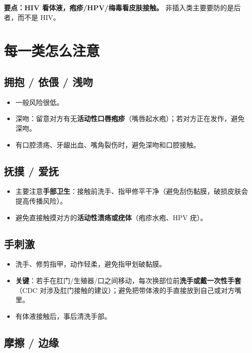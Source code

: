 \documentclass[12pt,UTF8,openany]{ctexbook}
\begin{document}
\textbf{要点：HIV 看体液，疱疹/HPV/梅毒看皮肤接触。}
非插入类主要要防的是后者，而不是 HIV。

\section{每一类怎么注意}

\subsection*{拥抱 / 依偎 / 浅吻}

\begin{itemize}[leftmargin=2em]
  \item 一般风险很低。
  \item 深吻：留意对方有无\textbf{活动性口唇疱疹}（嘴唇起水疱）；若对方正在发作，避免深吻。
  \item 有口腔溃疡、牙龈出血、嘴角裂伤时，避免深吻和口腔接触。
\end{itemize}

\subsection*{抚摸 / 爱抚}

\begin{itemize}[leftmargin=2em]
  \item 主要注意\textbf{手部卫生}：接触前洗手、指甲修平干净（避免刮伤黏膜，破损皮肤会提高传播风险）。
  \item 避免直接触摸对方的\textbf{活动性溃疡或疣体}（疱疹水疱、HPV 疣）。
\end{itemize}

\subsection*{手刺激}

\begin{itemize}[leftmargin=2em]
  \item 洗手、修剪指甲，动作轻柔，避免指甲划破黏膜。
  \item \textbf{关键}：若手在肛门/生殖器/口之间移动，每次换部位前\textbf{洗手或戴一次性手套}
        （CDC 对涉及肛门接触的建议）；避免把带体液的手直接放到自己或对方嘴里。
  \item 有体液接触后，事后清洗手部。
\end{itemize}

\subsection*{摩擦 / 边缘}
\end{document}
